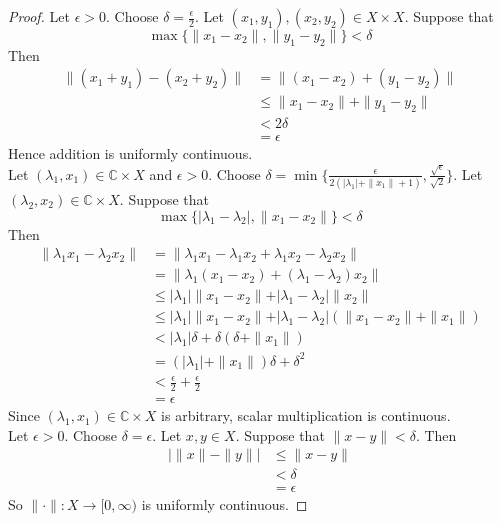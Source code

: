 \documentclass[12pt]{amsart}
\theoremstyle{definition}
\newcommand{\del}{\delta}
\newcommand{\lam}{\lambda}
\newcommand{\ep}{\epsilon}
\newcommand{\C}{\mathbb{C}}
\newcommand{\Rg}{[0,\infty)}
\DeclareMathOperator*{\0}{\mbf{0}}
\DeclareMathOperator*{\1}{\mbf{1}}
\begin{document}
	\begin{proof}
		Let $\ep > 0$. Choose $\del = \frac{\ep}{2}$. Let $(x_1,y_1), (x_2,y_2) \in X \times X$. Suppose that 
		$$\max\{\|x_1-x_2 \|, \|y_1 - y_2 \|\} < \del$$
		Then 
		\begin{align*}
			\|(x_1 + y_1) - (x_2+y_2) \|
			&= \|(x_1-x_2) + (y_1-y_2) \|\\
			& \leq \| x_1-x_2 \|+ \|y_1-y_2 \|\\
			& < 2\del \\
			&= \ep
		\end{align*} 
		Hence addition is uniformly continuous. \vspace{1cm}\\ Let $(\lam_1,x_1) \in \C \times X$ and $\ep >0$. Choose $\del = \min\{\frac{\ep}{2(\vert \lam_1 \vert + \|x_1 \|+ 1)}, \frac{\sqrt{\ep}}{\sqrt{2}}\}$. Let $(\lam_2, x_2) \in \C \times X$. Suppose that $$ \max\{\vert \lam_1-\lam_2 \vert , \|x_1 - x_2 \|\} < \del$$ 
		Then 
		\begin{align*}
			\|\lam_1x_1 - \lam_2x_2 \|
			&= \|\lam_1x_1 - \lam_1x_2 + \lam_1x_2- \lam_2x_2 \|\\
			&= \|\lam_1(x_1-x_2) + (\lam_1-\lam_2)x_2 \|\\
			& \leq \vert \lam_1 \vert \| x_1-x_2 \|+ \vert \lam_1-\lam_2 \vert \|x_2\|\\
			& \leq \vert \lam_1 \vert  \| x_1-x_2 \|+ \vert \lam_1-\lam_2 \vert (\|x_1 -x_2\|+ \|x_1\|)\\
			& < \vert \lam_1 \vert \del  +  \del( \del + \|x_1 \|)\\
			&= (\vert \lam_1 \vert + \|x_1 \|) \del + \del^2 \\
			&< \frac{\ep}{2}+ \frac{\ep}{2}\\
			&= \ep
		\end{align*}
		Since $(\lam_1, x_1) \in \C \times X$ is arbitrary, scalar multiplication is continuous. \vspace{1cm} \\ Let $\ep > 0$. Choose $\del = \ep$. Let $x,y \in X$. Suppose that $\|x-y \|< \del$. Then 
		\begin{align*}
			\big \vert \|x \|- \|y \|\big  \vert
			& \leq \|x - y \|\\
			&< \del\\
			&=\ep
		\end{align*}  
		So $\|\cdot \|: X \rightarrow \Rg$ is uniformly continuous.
	\end{proof}
	
	
	
\end{document}
